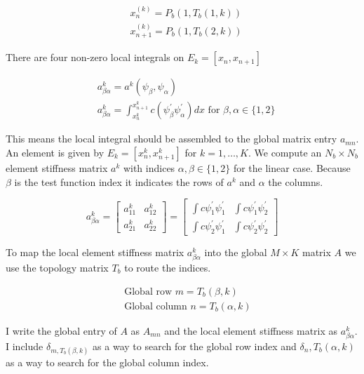 \documentclass[12pt, oneside]{book}
\begin{document}
$$
\begin{aligned}
& x_{n}^{(k)}=P_{b}\left(1, T_{b}(1, k)\right) \\
& x_{n+1}^{(k)}=P_{b}\left(1, T_{b}(2, k)\right)
\end{aligned}
$$

There are four non-zero local integrals on $E_{k}=\left[x_{n}, x_{n+1}\right]$

$$
\begin{aligned}
& a_{\beta \alpha}^{k}=a^{k}\left(\psi_{\beta}, \psi_{\alpha}\right)  \\
& a_{\beta \alpha}^{k}=\int_{x_{n}^{k}}^{x_{n+1}^{k}} c\left(\psi_{\beta}^{\prime} \psi_{\alpha}^{\prime}\right) d x \text { for } \beta, \alpha \in\{1,2\}
\end{aligned}
$$

This means the local integral should be assembled to the global matrix entry $a_{m n}$. An element is given 
by $E_{k}=\left[x_{n}^{k}, x_{n+1}^{k}\right]$ for $k=1, \ldots, K$. We compute an $N_{b} \times N_{b}$ 
element stiffness matrix $a^{k}$ with indices $\alpha, \beta \in\{1,2\}$ for the linear case. Because $\beta$ 
is the test function index it indicates the rows of $a^{k}$ and $\alpha$ the columns.

$$
a_{\beta \alpha}^{k}=\left[\begin{array}{cc}
a_{11}^{k} & a_{12}^{k} \\
a_{21}^{k} & a_{22}^{k}
\end{array}\right]=\left[\begin{array}{ll}
\int c \psi_{1}^{\prime} \psi_{1}^{\prime} & \int c \psi_{1}^{\prime} \psi_{2}^{\prime} \\
\int c \psi_{2}^{\prime} \psi_{1}^{\prime} & \int c \psi_{2}^{\prime} \psi_{2}^{\prime}
\end{array}\right]
$$

To map the local element stiffness matrix $a_{\beta \alpha}^{k}$ into the global $M \times K$ matrix $A$ we 
use the topology matrix $T_{b}$ to route the indices.

$$
\begin{aligned}
& \text { Global row } m=T_{b}(\beta, k) \\
& \text { Global column } n=T_{b}(\alpha, k)
\end{aligned}
$$

I write the global entry of $A$ as $A_{m n}$ and the local element stiffness matrix as $a_{\beta \alpha}^{k}$. I 
include $\delta_{m, T_{b}(\beta, k)}$ as a way to search for the global row index and $\delta_{n}, T_{b}(\alpha, k)$ 
as a way to search for the global column index.
\end{document}
